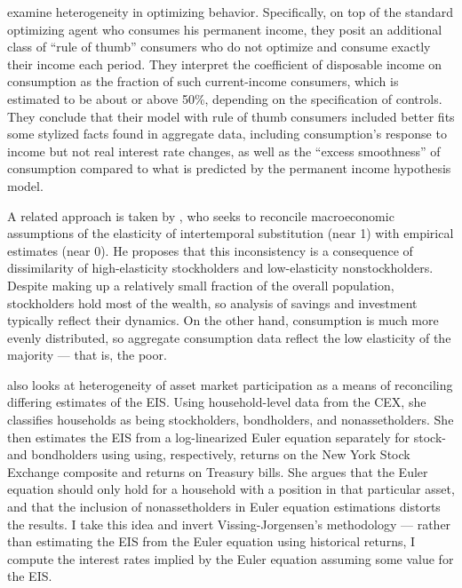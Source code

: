 \cite{campbell89} examine heterogeneity in optimizing behavior. Specifically, on top of the standard optimizing agent who consumes his permanent income, they posit an additional class of ``rule of thumb'' consumers who do not optimize and consume exactly their income each period. They interpret the coefficient of disposable income on consumption as the fraction of such current-income consumers, which is estimated to be about or above 50\%, depending on the specification of controls. They conclude that their model with rule of thumb consumers included better fits some stylized facts found in aggregate data, including consumption's response to income but not real interest rate changes, as well as the ``excess smoothness'' of consumption compared to what is predicted by the permanent income hypothesis model.

A related approach is taken by \cite{guvenen06}, who seeks to reconcile macroeconomic assumptions of the elasticity of intertemporal substitution (near 1) with empirical estimates (near 0). He proposes that this inconsistency is a consequence of dissimilarity of high-elasticity stockholders and low-elasticity nonstockholders. Despite making up a relatively small fraction of the overall population, stockholders hold most of the wealth, so analysis of savings and investment typically reflect their dynamics. On the other hand, consumption is much more evenly distributed, so aggregate consumption data reflect the low elasticity of the majority --- that is, the poor. 

\cite{vissing02} also looks at heterogeneity of asset market participation as a means of reconciling differing estimates of the EIS. Using household-level data from the CEX, she classifies households as being stockholders, bondholders, and nonassetholders. She then estimates the EIS from a log-linearized Euler equation separately for stock- and bondholders using using, respectively, returns on the New York Stock Exchange composite and returns on Treasury bills. She argues that the Euler equation should only hold for a household with a position in that particular asset, and that the inclusion of nonassetholders in Euler equation estimations distorts the results. I take this idea and invert Vissing-Jorgensen's methodology --- rather than estimating the EIS from the Euler equation using historical returns, I compute the interest rates implied by the Euler equation assuming some value for the EIS.
